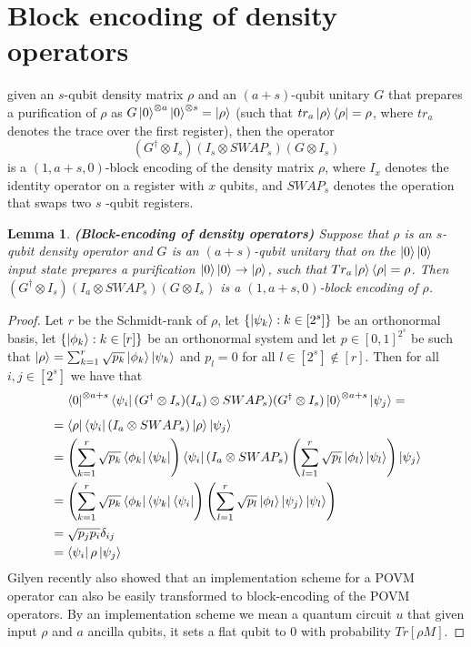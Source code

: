 \documentclass[12pt, oneside]{book}
\newtheorem{lemma}[theorem]{Lemma}
\theoremstyle{definition}
\theoremstyle{definition}
\theoremstyle{remark}
\begin{document}
\section{Block encoding of density operators}
given an $s$-qubit density matrix $\rho$ and an $(a+s)$-qubit unitary $G$ that prepares a purification of $\rho$ as $G\ket{0}^{\otimes a}\ket{0}^{\otimes s}=\ket{\rho}$ (such that $tr_a\ket{\rho}\bra{\rho}=\rho$, where $tr_a$ denotes the trace over the first register), then the operator
\[
(G^{\dagger}\otimes I_s)(I_s\otimes SWAP_s)(G\otimes I_s)
\]
is a $(1,a+s,0)$-block encoding of the density matrix $\rho$, where $I_x$ denotes the identity operator on a register with $x$ qubits, and $SWAP_s$ denotes the operation that swaps two $s$ -qubit registers.
\begin{lemma}
    \textbf{(Block-encoding of density operators)} Suppose that $\rho$ is an $s$-qubit density operator and $G$ is an $(a+s)$-qubit unitary that on the $\ket{0}\ket{0}$ input state prepares a purification $\ket{0}\ket{0}\rightarrow \ket{\rho}$, such that $Tr_a \ket{\rho}\bra{\rho}=\rho$. Then $(G^{\dagger}\otimes I_s)(I_a\otimes SWAP_s)(G\otimes I_s)$ is a $(1,a+s,0)$-block encoding of $\rho$.
\end{lemma}
\begin{proof}
    Let $r$ be the Schmidt-rank of $\rho$, let $\{\ket{\psi_k}:k\in[2^s]\}$ be an orthonormal basis, let $\{\ket{\phi_k}:k\in[r]\}$ be an orthonormal system and let $p \in [0,1]^{2^s}$ be such that $\ket{\rho}=\sum_{k=1}^r \sqrt{p_k}\ket{\phi_k}\ket{\psi_k}$ and $p_l=0$ for all $l\in[2^s] \notin [r]$. Then for all $i,j \in [2^s]$ we have that
    \[
        \bra{0}^{\otimes a+s}\bra{\psi_i}(G^{\dagger}\otimes I_s)(I_a)\otimes SWAP_s)(G^{\dagger}\otimes I_s)\ket{0}^{\otimes a+s}\ket{\psi_j}=
    \]
    \begin{align*}
        &=\bra{\rho}\bra{\psi_i}(I_a\otimes SWAP_s)\ket{\rho}\ket{\psi_j}\\
        &=\left(\sum_{k=1}^r \sqrt{p_k} \bra{\phi_k}\bra{\psi_k}\right)\bra{\psi_i}(I_a\otimes SWAP_s)\left(\sum_{l=1}^r\sqrt{p_l}\ket{\phi_l}\ket{\psi_l}\right) \ket{\psi_j}\\
        &=\left(\sum_{k=1}^r \sqrt{p_k}\bra{\phi_k}\bra{\psi_k}\bra{\psi_i}\right) \left(\sum_{l=1}^r \sqrt{p_l}\ket{\phi_l}\ket{\psi_j}\ket{\psi_l}\right)\\
        &=\sqrt{p_jp_i}\delta_{ij}\\
        &=\bra{\psi_i}\rho\ket{\psi_j}
    \end{align*}
    Gilyen recently also showed that an implementation scheme for a POVM operator can also be easily transformed to block-encoding of the POVM operators. By an implementation scheme we mean a quantum circuit $u$ that given input $\rho$ and $a$ ancilla qubits, it sets a flat qubit to $0$ with probability $Tr[\rho M]$.
\end{proof}
\end{document}
